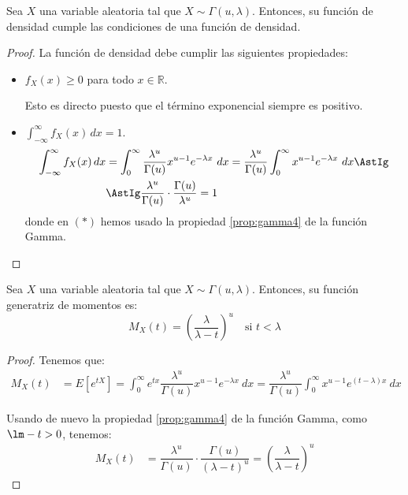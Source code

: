 \begin{prop}
    Sea $X$ una variable aleatoria tal que $X\sim \Gamma(u,\lambda)$. Entonces,
    su función de densidad cumple las condiciones de una función de densidad.
\end{prop}
\begin{proof}
    La función de densidad debe cumplir las siguientes propiedades:
    \begin{itemize}
        \item $f_X(x)\geq 0$ para todo $x\in \mathbb{R}$.
        
        Esto es directo puesto que el término exponencial siempre es positivo.
        
        \item $\displaystyle \int_{-\infty}^{\infty} f_X(x) \, dx = 1$.
        \begin{align*}
            \int_{-\infty}^{\infty} f_X(x) \, dx &= \int_{0}^{\infty} \dfrac{\lambda^u}{\Gamma(u)}x^{u-1}e^{-\lambda x}~dx
            = \dfrac{\lambda^u}{\Gamma(u)} \int_{0}^{\infty} x^{u-1}e^{-\lambda x}~dx
            \AstIg \\& \AstIg \dfrac{\lambda^u}{\Gamma(u)}\cdot \dfrac{\Gamma(u)}{\lambda^u} = 1
        \end{align*}
        donde en $(\ast)$ hemos usado la propiedad \ref{prop:gamma4} de la función Gamma.
    \end{itemize}
\end{proof}

\begin{prop}
    Sea $X$ una variable aleatoria tal que $X\sim \Gamma(u,\lambda)$. Entonces, su función generatriz de momentos es:
    \begin{equation*}
        M_X(t) = \left( \dfrac{\lambda}{\lambda-t} \right)^u \quad \text{si } t<\lambda
    \end{equation*}
\end{prop}
\begin{proof}
    Tenemos que:
    \begin{align*}
        M_X(t) &= E\left[e^{tX}\right] = \int_{0}^{\infty} e^{tx} \dfrac{\lambda^u}{\Gamma(u)}x^{u-1}e^{-\lambda x}~dx
        = \dfrac{\lambda^u}{\Gamma(u)} \int_{0}^{\infty} x^{u-1}e^{(t-\lambda)x}~dx
    \end{align*}
    
    Usando de nuevo la propiedad \ref{prop:gamma4} de la función Gamma, como $\lm-t>0$, tenemos:
    \begin{align*}
        M_X(t) &= \dfrac{\lambda^u}{\Gamma(u)} \cdot \dfrac{\Gamma(u)}{(\lambda-t)^u} = \left( \dfrac{\lambda}{\lambda-t} \right)^u
    \end{align*}
\end{proof}

